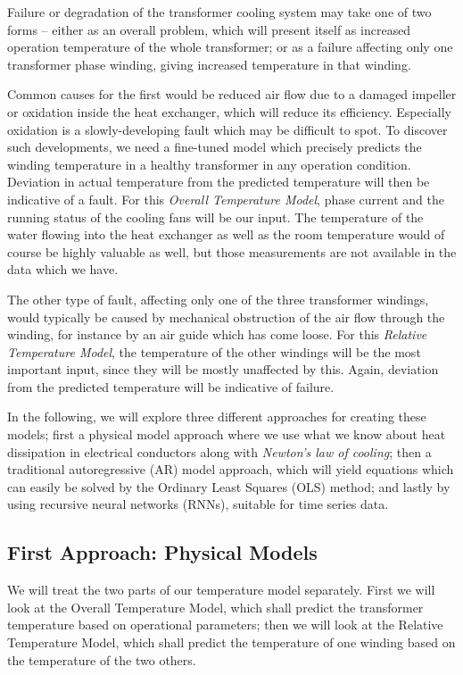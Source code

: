 \documentclass[]{article}
\begin{document}
Failure or degradation of the transformer cooling system may take one of two forms -- either as an overall problem, which will present itself as increased operation temperature of the whole transformer; or as a failure affecting only one transformer phase winding, giving increased temperature in that winding. 

Common causes for the first would be reduced air flow due to a damaged impeller or oxidation inside the heat exchanger, which will reduce its efficiency. Especially oxidation is a slowly-developing fault which may be difficult to spot. To discover such developments, we need a fine-tuned model which precisely predicts the winding temperature in a healthy transformer in any operation condition. Deviation in actual temperature from the predicted temperature will then be indicative of a fault. For this \textit{Overall Temperature Model}, phase current and the running status of the cooling fans will be our input. The temperature of the water flowing into the heat exchanger as well as the room temperature would of course be highly valuable as well, but those measurements are not available in the data which we have.

The other type of fault, affecting only one of the three transformer windings, would typically be caused by mechanical obstruction of the air flow through the winding, for instance by an air guide which has come loose. For this \textit{Relative Temperature Model}, the temperature of the other windings will be the most important input, since they will be mostly unaffected by this. Again, deviation from the predicted temperature will be indicative of failure.

In the following, we will explore three different approaches for creating these models; first a physical model approach where we use what we know about heat dissipation in electrical conductors along with \textit{Newton's law of cooling}; then a traditional autoregressive (AR) model approach, which will yield equations which can easily be solved by the Ordinary Least Squares (OLS) method; and lastly by using recursive neural networks (RNNs), suitable for time series data.

\subsection{First Approach: Physical Models} \label{sec:physical-model}
We will treat the two parts of our temperature model separately. First we will look at the Overall Temperature Model, which shall predict the transformer temperature based on operational parameters; then we will look at the Relative Temperature Model, which shall predict the temperature of one winding based on the temperature of the two others.
\end{document}
